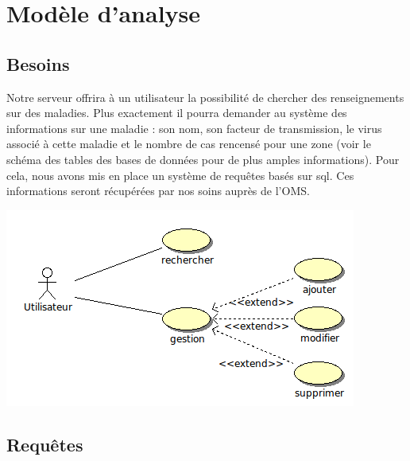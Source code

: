 \documentclass[12pt]{article}
\begin{document}
\newpage

\section{Modèle d'analyse}

\subsection{Besoins}

	Notre serveur offrira à un utilisateur la possibilité de chercher des renseignements sur des maladies. Plus exactement il pourra demander au système des informations sur une maladie : son nom, son facteur de transmission, le virus associé à cette maladie et le nombre de cas rencensé pour une zone (voir le schéma des tables des bases de données pour de plus amples informations). Pour cela, nous avons mis en place un système de requêtes basés sur sql. Ces informations seront récupérées par nos soins auprès de l'OMS.\\
	
\begin{center}
	\includegraphics[scale=0.70]{images/SimpleUseCase.png}
\end{center}

\subsection{Requêtes}
\end{document}
